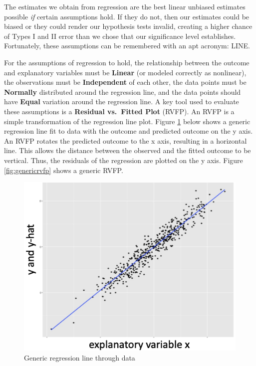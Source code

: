 \documentclass[
]{book}
\begin{document}
The estimates we obtain from regression are the best linear unbiased estimates possible \emph{if} certain assumptions hold. If they do not, then our estimates could be biased or they could render our hypothesis tests invalid, creating a higher chance of Types I and II error than we chose that our significance level establishes. Fortunately, these assumptions can be remembered with an apt acronym: LINE.

For the assumptions of regression to hold, the relationship between the outcome and explanatory variables must be \textbf{Linear} (or modeled correctly as nonlinear), the observations must be \textbf{Independent} of each other, the data points must be \textbf{Normally} distributed around the regression line, and the data points should have \textbf{Equal} variation around the regression line. A key tool used to evaluate these assumptions is a \textbf{Residual vs.~Fitted Plot} (RVFP). An RVFP is a simple transformation of the regression line plot. Figure \ref{fig:genericreg} below shows a generic regression line fit to data with the outcome and predicted outcome on the y axis. An RVFP rotates the predicted outcome to the x axis, resulting in a horizontal line. This allows the distance between the observed and the fitted outcome to be vertical. Thus, the residuals of the regression are plotted on the y axis. Figure \ref{fig:genericrvfp} shows a generic RVFP.

\begin{figure}
\includegraphics[width=7.01in]{images/genericreg} \caption{Generic regression line through data}\label{fig:genericreg}
\end{figure}
\end{document}
